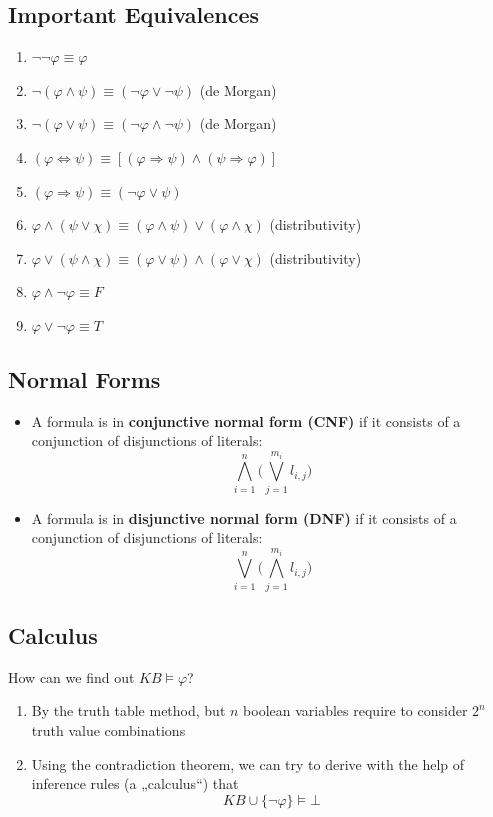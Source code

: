 \documentclass[conference]{styles/acmsiggraph}
\begin{document}
    \subsection{Important Equivalences}
        \begin{enumerate}
            \item $\lnot\lnot \varphi \equiv \varphi$
            \item $\lnot (\varphi \land \psi) \equiv (\lnot \varphi \vee \lnot \psi)$ (de Morgan)
            \item $\lnot (\varphi \vee \psi) \equiv (\lnot \varphi \land \lnot \psi)$ (de Morgan)
            \item $(\varphi \Leftrightarrow \psi) \equiv [(\varphi \Rightarrow \psi) \land (\psi \Rightarrow \varphi)]$
            \item $(\varphi \Rightarrow \psi) \equiv (\lnot \varphi \vee \psi)$
            \item $\varphi \land (\psi \vee \chi) \equiv (\varphi \land \psi) \vee (\varphi \land \chi)$ (distributivity)
            \item $\varphi \vee (\psi \land \chi) \equiv (\varphi \vee \psi) \land (\varphi \vee \chi)$ (distributivity)
            \item $\varphi \land \lnot \varphi \equiv F$
            \item $\varphi \vee \lnot \varphi \equiv T$
        \end{enumerate}
    
    
    \subsection{Normal Forms}
        \begin{itemize}
            \item A formula is in \textbf{conjunctive normal form (CNF)} if it consists of a conjunction of disjunctions of literals:
             $$\bigwedge\limits_{i=1}^n \Biggl(\bigvee\limits_{j=1}^{m_i} l_{i,j} \Biggr)$$
             \item A formula is in \textbf{disjunctive normal form (DNF)} if it consists of a conjunction of disjunctions of literals:
             $$\bigvee\limits_{i=1}^n \Biggl(\bigwedge\limits_{j=1}^{m_i} l_{i,j} \Biggr)$$
        \end{itemize}
    
    
    \subsection{Calculus}
        How can we find out $KB \vDash \varphi$?
        \begin{enumerate}
            \item By the truth table method, but $n$ boolean variables require to consider $2^n$ truth value combinations
            \item Using the contradiction theorem, we can try to derive with the help of inference rules (a „calculus“) that
                $$KB \cup \{ \lnot \varphi \} \vDash \bot$$
        \end{enumerate}
    
\end{document}
